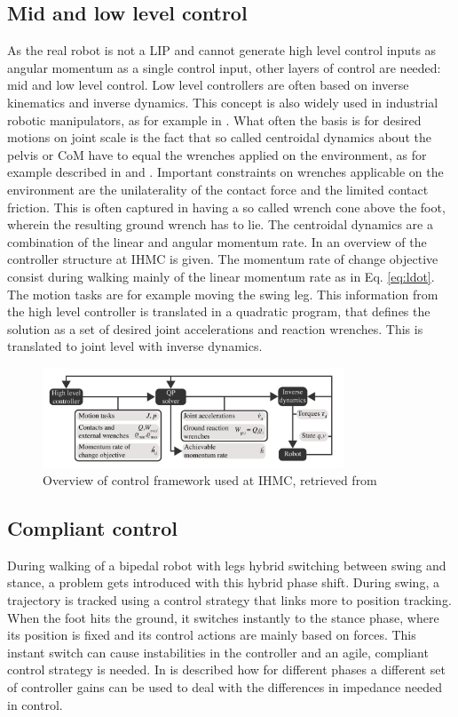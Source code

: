 \subsection{Mid and low level control}
As the real robot is not a \ac{LIP} and cannot generate high level control inputs as angular momentum as a single control input, other layers of control are needed: mid and low level control. Low level controllers are often based on inverse kinematics and inverse dynamics. This concept is also widely used in industrial robotic manipulators, as for example in \cite{asada1990inverse}. What often the basis is for desired motions on joint scale is the fact that so called centroidal dynamics about the pelvis or \ac{CoM} have to equal the wrenches applied on the environment, as for example described in \cite{kajita2003resolved} and \cite{koolen2016design}. Important constraints on wrenches applicable on the environment are the unilaterality of the contact force and the limited contact friction. This is often captured in having a so called wrench cone above the foot, wherein the resulting ground wrench has to lie. The centroidal dynamics are a combination of the linear and angular momentum rate. In  an overview of the controller structure at IHMC is given. The momentum rate of change objective consist during walking mainly of the linear momentum rate as in Eq. \eqref{eq:ldot}. The motion tasks are for example moving the swing leg. This information from the high level controller is translated in a quadratic program, that defines the solution as a set of desired joint accelerations and reaction wrenches. This is translated to joint level with inverse dynamics.
\begin{figure}[h]
\centering
\includegraphics[width=0.8\textwidth]{STYLESTUFF/controlframework.png}
\caption{Overview of control framework used at IHMC, retrieved from \cite{koolen2016design}}
\label{fig:controlframework}
\end{figure}
\subsection{Compliant control}
During walking of a bipedal robot with legs hybrid switching between swing and stance, a problem gets introduced with this hybrid phase shift. During swing, a trajectory is tracked using a control strategy that links more to position tracking. When the foot hits the ground, it switches instantly to the stance phase, where its position is fixed and its control actions are mainly based on forces. This instant switch can cause instabilities in the controller and an agile, compliant control strategy is needed. In \cite{sentis2006whole} is described how for different phases a different set of controller gains can be used to deal with the differences in impedance needed in control. 

